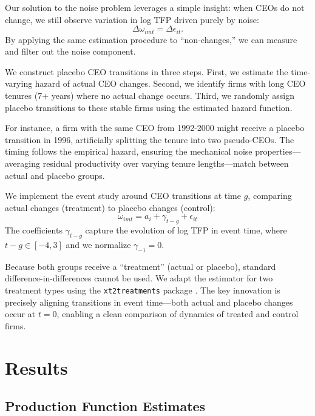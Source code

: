 \documentclass[11pt,a4paper]{article}
\begin{document}
Our solution to the noise problem leverages a simple insight: when CEOs do not change, we still observe variation in log TFP driven purely by noise:
\begin{equation}
\Delta\omega_{imt} = \Delta\epsilon_{it}.
\end{equation}
By applying the same estimation procedure to ``non-changes,'' we can measure and filter out the noise component.

We construct placebo CEO transitions in three steps. First, we estimate the time-varying hazard of actual CEO changes. Second, we identify firms with long CEO tenures (7+ years) where no actual change occurs. Third, we randomly assign placebo transitions to these stable firms using the estimated hazard function.

For instance, a firm with the same CEO from 1992-2000 might receive a placebo transition in 1996, artificially splitting the tenure into two pseudo-CEOs. The timing follows the empirical hazard, ensuring the mechanical noise properties—averaging residual productivity over varying tenure lengths—match between actual and placebo groups.

We implement the event study around CEO transitions at time $g$, comparing actual changes (treatment) to placebo changes (control):
\begin{equation}
\omega_{imt} = a_i + \gamma_{t-g} + \epsilon_{it}
\end{equation}
The coefficients $\gamma_{t-g}$ capture the evolution of log TFP in event time, where $t-g \in [-4, 3]$ and we normalize $\gamma_{-1} = 0$.

Because both groups receive a ``treatment'' (actual or placebo), standard difference-in-differences cannot be used. We adapt the \citet{Callaway2021JoLE} estimator for two treatment types using the \texttt{xt2treatments} package \citep{Koren2024xt2treatments}. The key innovation is precisely aligning transitions in event time—both actual and placebo changes occur at $t=0$, enabling a clean comparison of dynamics of treated and control firms.



\section{Results}

\subsection{Production Function Estimates}
\end{document}
